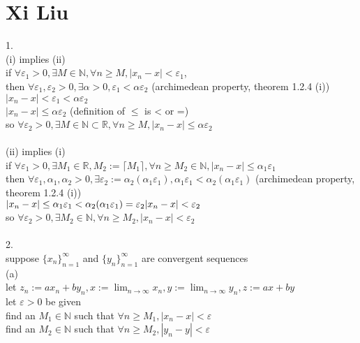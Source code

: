 \documentclass[12pt, border = 4pt, multi]{article} %
\begin{document}
\section*{Xi Liu}
1.\\
(i) implies (ii)\\
if $\forall \varepsilon_1 > 0, \exists M \in \mathbb{N}, \forall n \geq M, |x_n - x| < \varepsilon_1$,\\
then $\forall \varepsilon_1, \varepsilon_2 > 0, \exists \alpha > 0, \varepsilon_1 < \alpha \varepsilon_2$ (archimedean property, theorem 1.2.4 (i))\\
$|x_n - x| < \varepsilon_1 < \alpha \varepsilon_2$\\
$|x_n - x| \leq \alpha\varepsilon_2$ (definition of $\leq$ is < or =)\\
so $\forall \varepsilon_2 > 0, \exists M \in \mathbb{N} \subset \mathbb{R}, \forall n \geq M, |x_n - x| \leq \alpha\varepsilon_2$\\
\\
(ii) implies (i)\\
if $\forall \varepsilon_1 > 0, \exists M_1 \in \mathbb{R}, M_2 := \lceil M_1 \rceil, \forall n \geq M_2 \in \mathbb{N}, |x_n - x| \leq \alpha_1\varepsilon_1$\\
then $\forall \varepsilon_1, \alpha_1, \alpha_2 > 0, \exists \varepsilon_2 := \alpha_2(\alpha_1\varepsilon_1), \alpha_1\varepsilon_1 < \alpha_2(\alpha_1 \varepsilon_1)$ (archimedean property, theorem 1.2.4 (i))\\
$|x_n - x| \leq \alpha_1\varepsilon_1 < \alpha_2(\alpha_1\varepsilon_1) = \varepsilon_2\\
|x_n - x| < \varepsilon_2$\\
so $\forall \varepsilon_2 > 0, \exists M_2 \in \mathbb{N}, \forall n \geq M_2, |x_n - x| < \varepsilon_2$\\
\\
2.\\
suppose $\{x_n\}_{n = 1} ^ {\infty}$ and $\{y_n\}_{n = 1} ^ {\infty}$ are convergent sequences\\
(a)\\
let $z_n := ax_n + by_n, x := \lim_{n \rightarrow \infty} x_n, y := \lim_{n \rightarrow \infty} y_n, z := ax + by$\\
let $\varepsilon > 0$ be given\\
find an $M_1 \in \mathbb{N}$ such that $\forall n \geq M_1, |x_n - x| < \varepsilon$\\
find an $M_2 \in \mathbb{N}$ such that $\forall n \geq M_2, |y_n - y| < \varepsilon$\\
\end{document}
